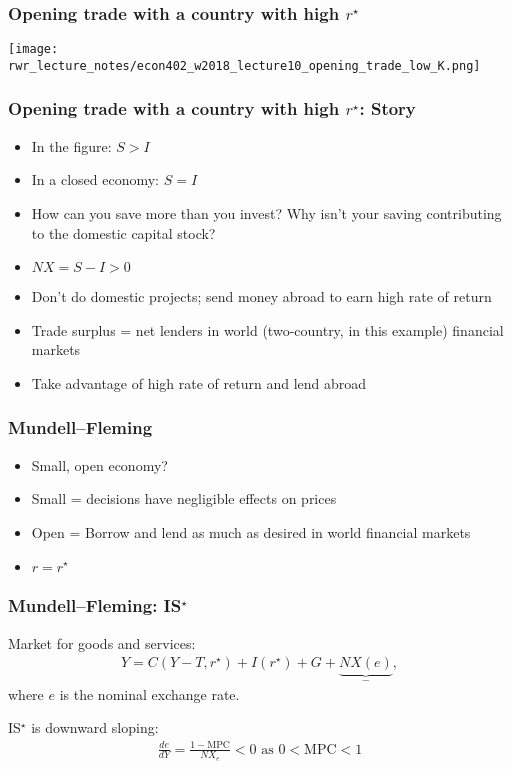 \documentclass[presentation,dvipsnames]{beamer}
\begin{document}
\begin{frame}
\frametitle{Opening trade with a country with high $r^{\star}$}
\centerline{\texttt{[image: rwr\_lecture\_notes/econ402\_w2018\_lecture10\_opening\_trade\_low\_K.png]}}
\end{frame}

\begin{frame}
\frametitle{Opening trade with a country with high $r^{\star}$: Story}
\begin{itemize}[label={--}]
\item In the figure: $S > I$
\item In a closed economy: $S = I$
\item How can you save more than you invest? Why isn't your saving contributing to the domestic capital stock?
\item $NX = S - I > 0$
\item Don't do domestic projects; send money abroad to earn high rate of return
\item Trade surplus = net lenders in world (two-country, in this example) financial markets
\item \textcolor{RubineRed}{Take advantage of high rate of return and lend abroad}
\end{itemize}
\end{frame}

\begin{frame}
\frametitle{Mundell--Fleming}
\begin{itemize}[label={--}]
\item Small, open economy?
\item Small = decisions have negligible effects on prices
\item Open = Borrow and lend as much as desired in world financial markets
\item $r = r^{\star}$
\end{itemize}
\end{frame}

\begin{frame}
\frametitle{Mundell--Fleming: IS$^{\star}$}
Market for goods and services:
\begin{align*}
Y = C(Y-T, r^{\star})  + I(r^{\star}) + G + \underbrace{NX(e)}_{-} ,
\end{align*}
where $e$ is the nominal exchange rate.

\vspace{1em}

IS$^{\star}$ is downward sloping:
\begin{align*}
\frac{de}{dY} = \frac{1-\text{MPC}}{NX_{e}} < 0 \text{ as } 0 < \text{MPC} < 1
\end{align*}
\end{frame}
\end{document}
